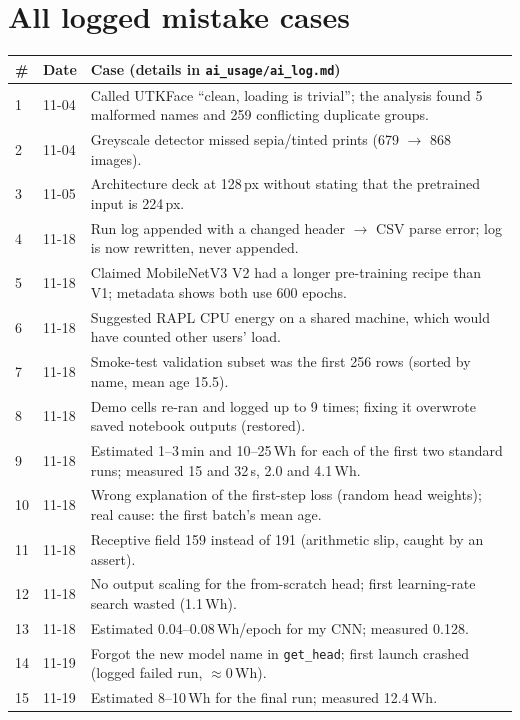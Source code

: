 \documentclass[10pt,a4paper]{article}
\begin{document}
\appendix
\section{All logged mistake cases}
\label{app:cases}
\footnotesize
\begin{longtable}{@{}p{0.5cm}p{1.2cm}p{14.6cm}@{}}
\toprule
\# & Date & Case (details in \texttt{ai\_usage/ai\_log.md}) \\
\midrule\endhead
1 & 11-04 & Called UTKFace ``clean, loading is trivial''; the analysis found 5 malformed names and 259 conflicting duplicate groups. \\
2 & 11-04 & Greyscale detector missed sepia/tinted prints (679 $\to$ 868 images). \\
3 & 11-05 & Architecture deck at 128\,px without stating that the pretrained input is 224\,px. \\
4 & 11-18 & Run log appended with a changed header $\to$ CSV parse error; log is now rewritten, never appended. \\
5 & 11-18 & Claimed MobileNetV3 V2 had a longer pre-training recipe than V1; metadata shows both use 600 epochs. \\
6 & 11-18 & Suggested RAPL CPU energy on a shared machine, which would have counted other users' load. \\
7 & 11-18 & Smoke-test validation subset was the first 256 rows (sorted by name, mean age 15.5). \\
8 & 11-18 & Demo cells re-ran and logged up to 9 times; fixing it overwrote saved notebook outputs (restored). \\
9 & 11-18 & Estimated 1--3\,min and 10--25\,Wh for each of the first two standard runs; measured 15 and 32\,s, 2.0 and 4.1\,Wh. \\
10 & 11-18 & Wrong explanation of the first-step loss (random head weights); real cause: the first batch's mean age. \\
11 & 11-18 & Receptive field 159 instead of 191 (arithmetic slip, caught by an assert). \\
12 & 11-18 & No output scaling for the from-scratch head; first learning-rate search wasted (1.1\,Wh). \\
13 & 11-18 & Estimated 0.04--0.08\,Wh/epoch for my CNN; measured 0.128. \\
14 & 11-19 & Forgot the new model name in \texttt{get\_head}; first launch crashed (logged failed run, $\approx$0\,Wh). \\
15 & 11-19 & Estimated 8--10\,Wh for the final run; measured 12.4\,Wh. \\

\end{longtable}
\end{document}
